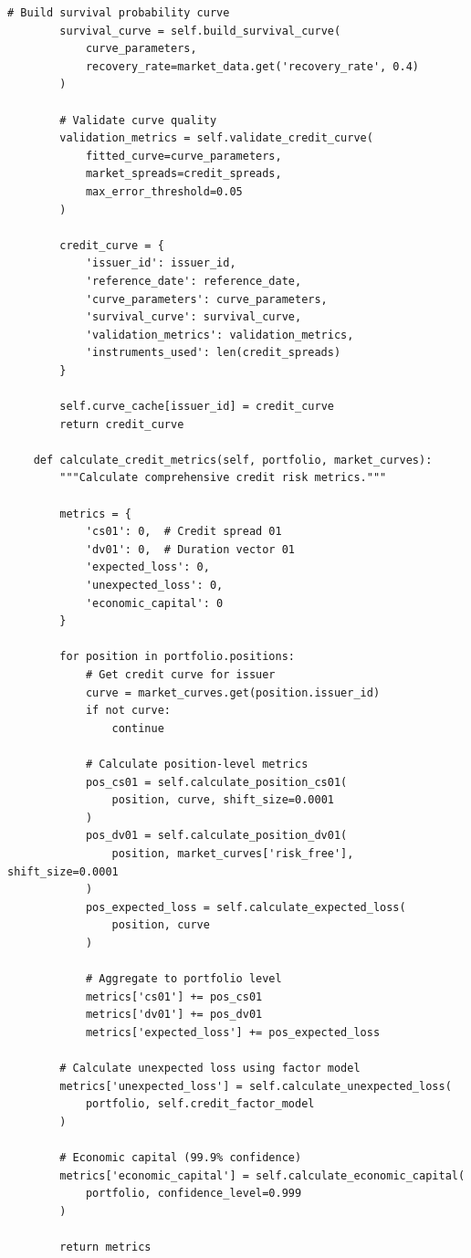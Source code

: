 \documentclass[12pt,a4paper]{article}
\theoremstyle{definition}
\theoremstyle{remark}
\begin{document}
\begin{lstlisting}[caption=Multi-Asset Credit Curve Construction]
        # Build survival probability curve
        survival_curve = self.build_survival_curve(
            curve_parameters,
            recovery_rate=market_data.get('recovery_rate', 0.4)
        )
        
        # Validate curve quality
        validation_metrics = self.validate_credit_curve(
            fitted_curve=curve_parameters,
            market_spreads=credit_spreads,
            max_error_threshold=0.05
        )
        
        credit_curve = {
            'issuer_id': issuer_id,
            'reference_date': reference_date,
            'curve_parameters': curve_parameters,
            'survival_curve': survival_curve,
            'validation_metrics': validation_metrics,
            'instruments_used': len(credit_spreads)
        }
        
        self.curve_cache[issuer_id] = credit_curve
        return credit_curve
    
    def calculate_credit_metrics(self, portfolio, market_curves):
        """Calculate comprehensive credit risk metrics."""
        
        metrics = {
            'cs01': 0,  # Credit spread 01
            'dv01': 0,  # Duration vector 01
            'expected_loss': 0,
            'unexpected_loss': 0,
            'economic_capital': 0
        }
        
        for position in portfolio.positions:
            # Get credit curve for issuer
            curve = market_curves.get(position.issuer_id)
            if not curve:
                continue
            
            # Calculate position-level metrics
            pos_cs01 = self.calculate_position_cs01(
                position, curve, shift_size=0.0001
            )
            pos_dv01 = self.calculate_position_dv01(
                position, market_curves['risk_free'], shift_size=0.0001
            )
            pos_expected_loss = self.calculate_expected_loss(
                position, curve
            )
            
            # Aggregate to portfolio level
            metrics['cs01'] += pos_cs01
            metrics['dv01'] += pos_dv01
            metrics['expected_loss'] += pos_expected_loss
        
        # Calculate unexpected loss using factor model
        metrics['unexpected_loss'] = self.calculate_unexpected_loss(
            portfolio, self.credit_factor_model
        )
        
        # Economic capital (99.9% confidence)
        metrics['economic_capital'] = self.calculate_economic_capital(
            portfolio, confidence_level=0.999
        )
        
        return metrics
\end{lstlisting}
\end{document}
